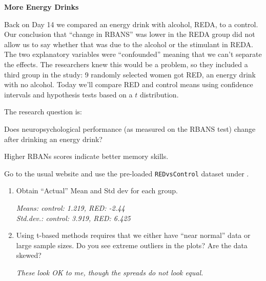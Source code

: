 \def\theTopic{Energy Drinks II}
\def\dayNum{25 }

\begin{center}
{\bf {\large \textbf{More Energy Drinks}}}
\end{center}

Back on Day 14 we compared an energy drink with
alcohol, REDA, to a control.  Our conclusion that ``change in RBANS''
was lower in the REDA group did not allow us to say whether that was
due to the alcohol 
or the stimulant in REDA.  The two  explanatory variables were
``confounded'' meaning that we can't separate the effects.  The
researchers knew this would be a problem, so they included a third
group in the study: 9 randomly selected women got RED, an energy drink
with no alcohol.  Today we'll compare RED and control means using
confidence intervals and hypothesis tests based on a $t$
distribution. 

  The research question is: 

  {\sf
    Does neuropsychological performance (as measured on the RBANS
    test) change after drinking an energy drink? }

   Higher RBANs scores indicate better memory skills.

 Go to the usual website and use the pre-loaded {\tt REDvsControl}
 dataset under .

  \begin{enumerate}
  \item  Obtain ``Actual'' Mean and Std dev for each group. 
\begin{students}
    \vspace{4cm}    
\end{students}

\begin{key}
  {\it Means:  control: 1.219, RED: -2.44 \\%
       Std.dev.: control: 3.919, RED: 6.425}%
\end{key}

\item Using t-based methods requires that we either have ``near
  normal'' data or  large sample sizes.  Do you see extreme outliers
  in the plots?  Are the data skewed?

\begin{students}
    \vspace{2cm}    
\end{students}

\begin{key}
  {\it  These look OK to me, though the spreads do not look equal.}
\end{key}

\end{enumerate}


